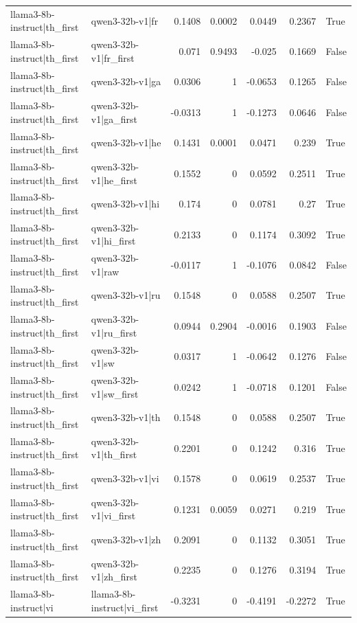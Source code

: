 \begin{table}
\begin{tabular}{l l r r r r l}
llama3-8b-instruct|th_first & qwen3-32b-v1|fr & 0.1408 & 0.0002 & 0.0449 & 0.2367 & True \\
llama3-8b-instruct|th_first & qwen3-32b-v1|fr_first & 0.071 & 0.9493 & -0.025 & 0.1669 & False \\
llama3-8b-instruct|th_first & qwen3-32b-v1|ga & 0.0306 & 1 & -0.0653 & 0.1265 & False \\
llama3-8b-instruct|th_first & qwen3-32b-v1|ga_first & -0.0313 & 1 & -0.1273 & 0.0646 & False \\
llama3-8b-instruct|th_first & qwen3-32b-v1|he & 0.1431 & 0.0001 & 0.0471 & 0.239 & True \\
llama3-8b-instruct|th_first & qwen3-32b-v1|he_first & 0.1552 & 0 & 0.0592 & 0.2511 & True \\
llama3-8b-instruct|th_first & qwen3-32b-v1|hi & 0.174 & 0 & 0.0781 & 0.27 & True \\
llama3-8b-instruct|th_first & qwen3-32b-v1|hi_first & 0.2133 & 0 & 0.1174 & 0.3092 & True \\
llama3-8b-instruct|th_first & qwen3-32b-v1|raw & -0.0117 & 1 & -0.1076 & 0.0842 & False \\
llama3-8b-instruct|th_first & qwen3-32b-v1|ru & 0.1548 & 0 & 0.0588 & 0.2507 & True \\
llama3-8b-instruct|th_first & qwen3-32b-v1|ru_first & 0.0944 & 0.2904 & -0.0016 & 0.1903 & False \\
llama3-8b-instruct|th_first & qwen3-32b-v1|sw & 0.0317 & 1 & -0.0642 & 0.1276 & False \\
llama3-8b-instruct|th_first & qwen3-32b-v1|sw_first & 0.0242 & 1 & -0.0718 & 0.1201 & False \\
llama3-8b-instruct|th_first & qwen3-32b-v1|th & 0.1548 & 0 & 0.0588 & 0.2507 & True \\
llama3-8b-instruct|th_first & qwen3-32b-v1|th_first & 0.2201 & 0 & 0.1242 & 0.316 & True \\
llama3-8b-instruct|th_first & qwen3-32b-v1|vi & 0.1578 & 0 & 0.0619 & 0.2537 & True \\
llama3-8b-instruct|th_first & qwen3-32b-v1|vi_first & 0.1231 & 0.0059 & 0.0271 & 0.219 & True \\
llama3-8b-instruct|th_first & qwen3-32b-v1|zh & 0.2091 & 0 & 0.1132 & 0.3051 & True \\
llama3-8b-instruct|th_first & qwen3-32b-v1|zh_first & 0.2235 & 0 & 0.1276 & 0.3194 & True \\
llama3-8b-instruct|vi & llama3-8b-instruct|vi_first & -0.3231 & 0 & -0.4191 & -0.2272 & True \\

\end{tabular}
\end{table}
